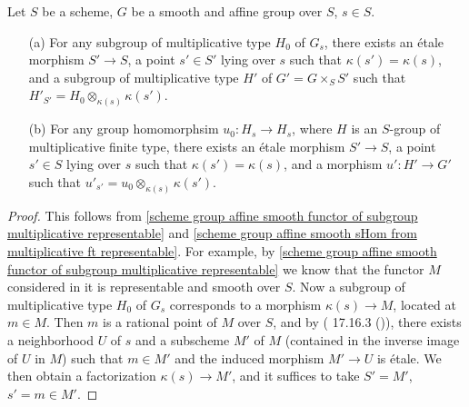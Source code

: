 \begin{theorem}\label{scheme group affine smooth multiplicative fiber etale lifting}
Let $S$ be a scheme, $G$ be a smooth and affine group over $S$, $s\in S$.
\begin{enumerate}
    \item[(a)] For any subgroup of multiplicative type $H_0$ of $G_s$, there exists an \'etale morphism $S'\to S$, a point $s'\in S'$ lying over $s$ such that $\kappa(s')=\kappa(s)$, and a subgroup of multiplicative type $H'$ of $G'=G\times_SS'$ such that $H'_{S'}=H_0\otimes_{\kappa(s)}\kappa(s')$.
    \item[(b)] For any group homomorphsim $u_0:H_s\to H_s$, where $H$ is an $S$-group of multiplicative finite type, there exists an \'etale morphism $S'\to S$, a point $s'\in S$ lying over $s$ such that $\kappa(s')=\kappa(s)$, and a morphism $u':H'\to G'$ such that $u'_{s'}=u_0\otimes_{\kappa(s)}\kappa(s')$.
\end{enumerate}
\end{theorem}
\begin{proof}
This follows from \cref{scheme group affine smooth functor of subgroup multiplicative representable} and \cref{scheme group affine smooth sHom from multiplicative ft representable}. For example, by \cref{scheme group affine smooth functor of subgroup multiplicative representable} we know that the functor $M$ considered in it is representable and smooth over $S$. Now a subgroup of multiplicative type $H_0$ of $G_s$ corresponds to a morphism $\kappa(s)\to M$, located at $m\in M$. Then $m$ is a rational point of $M$ over $S$, and by (\cite{EGA4-4} 17.16.3 ()), there exists a neighborhood $U$ of $s$ and a subscheme $M'$ of $M$ (contained in the inverse image of $U$ in $M$) such that $m\in M'$ and the induced morphism $M'\to U$ is \'etale. We then obtain a factorization $\kappa(s)\to M'$, and it suffices to take $S'=M'$, $s'=m\in M'$.
\end{proof}

